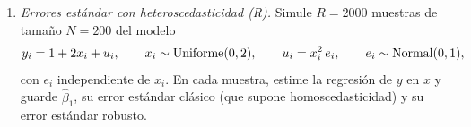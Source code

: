 \documentclass[letterpaper,11pt]{article}
\newcommand{\fn}[1]{{\unskip\nobreak\hfill\penalty50\hskip1em\null\nobreak\hfill
    \mbox{[#1]}\parfillskip=0pt\finalhyphendemerits=0\par}}
\begin{document}
\begin{enumerate}[itemsep=0.8em]
\item \emph{Errores estándar con heteroscedasticidad (R).} Simule $R=2000$ muestras de
    tamaño $N=200$ del modelo
    \begin{align*}
    y_i=1+2x_i+u_i,\qquad x_i\sim\text{Uniforme}(0,2),\qquad u_i=x_i^2\,e_i,\qquad
    e_i\sim\operatorname{Normal}(0,1),
    \end{align*}
    con $e_i$ independiente de $x_i$. En cada muestra, estime la regresión de $y$ en $x$ y
    guarde $\hat\beta_1$, su error estándar clásico (que supone homoscedasticidad) y su error
    estándar robusto.
\end{enumerate}
\end{document}
